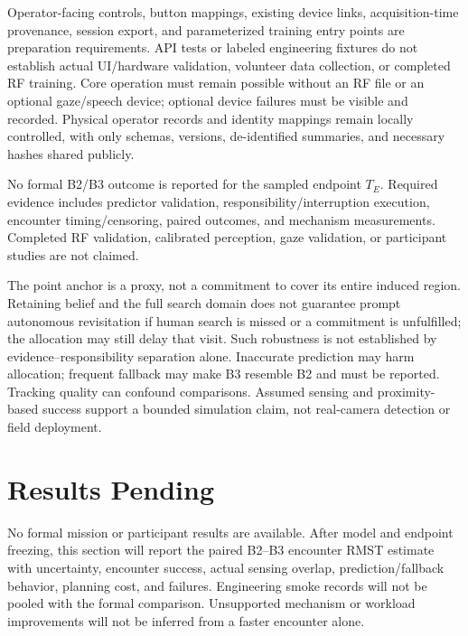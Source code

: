 \documentclass[conference]{IEEEtran}
\begin{document}
Operator-facing controls, button mappings, existing device links, acquisition-time provenance, session export, and parameterized training entry points are preparation requirements. API tests or labeled engineering fixtures do not establish actual UI/hardware validation, volunteer data collection, or completed RF training. Core operation must remain possible without an RF file or an optional gaze/speech device; optional device failures must be visible and recorded. Physical operator records and identity mappings remain locally controlled, with only schemas, versions, de-identified summaries, and necessary hashes shared publicly.

No formal B2/B3 outcome is reported for the sampled endpoint $T_E$. Required evidence includes predictor validation, responsibility/interruption execution, encounter timing/censoring, paired outcomes, and mechanism measurements. Completed RF validation, calibrated perception, gaze validation, or participant studies are not claimed.

The point anchor is a proxy, not a commitment to cover its entire induced region. Retaining belief and the full search domain does not guarantee prompt autonomous revisitation if human search is missed or a commitment is unfulfilled; the allocation may still delay that visit. Such robustness is not established by evidence--responsibility separation alone. Inaccurate prediction may harm allocation; frequent fallback may make B3 resemble B2 and must be reported. Tracking quality can confound comparisons. Assumed sensing and proximity-based success support a bounded simulation claim, not real-camera detection or field deployment.

\section{Results Pending}
No formal mission or participant results are available. After model and endpoint freezing, this section will report the paired B2--B3 encounter RMST estimate with uncertainty, encounter success, actual sensing overlap, prediction/fallback behavior, planning cost, and failures. Engineering smoke records will not be pooled with the formal comparison. Unsupported mechanism or workload improvements will not be inferred from a faster encounter alone.
\end{document}
